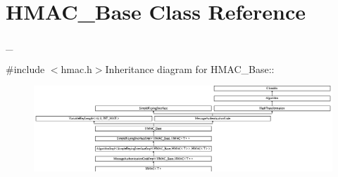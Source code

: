 \hypertarget{class_h_m_a_c___base}{
\section{HMAC\_\-Base Class Reference}
\label{class_h_m_a_c___base}
}


\_\-  


{\ttfamily \#include $<$hmac.h$>$}Inheritance diagram for HMAC\_\-Base::\begin{figure}[H]
\begin{center}
\leavevmode
\includegraphics[height=3.23077cm]{class_h_m_a_c___base}
\end{center}
\end{figure}
